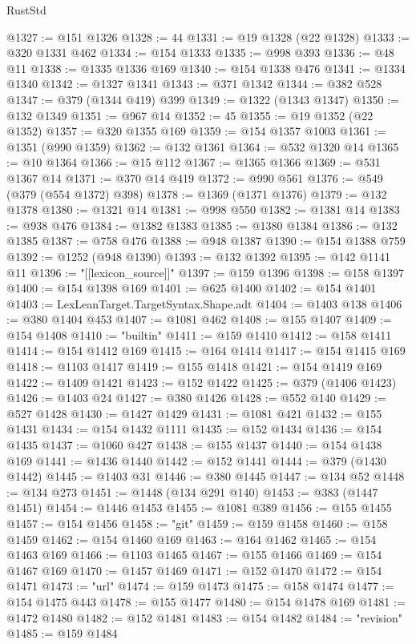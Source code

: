 \begin{lexlean}{RustStd}
\begin{coremodule}
@1327 := @151 @1326
@1328 := 44
@1331 := @19 @1328 (@22 @1328)
@1333 := @320 @1331 @462
@1334 := @154 @1333
@1335 := @998 @393
@1336 := @48 @11
@1338 := @1335 @1336 @169
@1340 := @154 @1338 @476
@1341 := @1334 @1340
@1342 := @1327 @1341
@1343 := @371 @1342
@1344 := @382 @528
@1347 := @379 (@1344 @419) @399
@1349 := @1322 (@1343 @1347)
@1350 := @132 @1349
@1351 := @967 @14
@1352 := 45
@1355 := @19 @1352 (@22 @1352)
@1357 := @320 @1355 @169
@1359 := @154 @1357 @1003
@1361 := @1351 (@990 @1359)
@1362 := @132 @1361
@1364 := @532 @1320 @14
@1365 := @10 @1364
@1366 := @15 @112
@1367 := @1365 @1366
@1369 := @531 @1367 @14
@1371 := @370 @14 @419
@1372 := @990 @561
@1376 := @549 (@379 (@554 @1372) @398)
@1378 := @1369 (@1371 @1376)
@1379 := @132 @1378
@1380 := @1321 @14
@1381 := @998 @550
@1382 := @1381 @14
@1383 := @938 @476
@1384 := @1382 @1383
@1385 := @1380 @1384
@1386 := @132 @1385
@1387 := @758 @476
@1388 := @948 @1387
@1390 := @154 @1388 @759
@1392 := @1252 (@948 @1390)
@1393 := @132 @1392
@1395 := @142 @1141 @11
@1396 := "[[lexicon_source]]"
@1397 := @159 @1396
@1398 := @158 @1397
@1400 := @154 @1398 @169
@1401 := @625 @1400
@1402 := @154 @1401
@1403 := LexLeanTarget.TargetSyntax.Shape.adt
@1404 := @1403 @138
@1406 := @380 @1404 @453
@1407 := @1081 @462
@1408 := @155 @1407
@1409 := @154 @1408
@1410 := "builtin"
@1411 := @159 @1410
@1412 := @158 @1411
@1414 := @154 @1412 @169
@1415 := @164 @1414
@1417 := @154 @1415 @169
@1418 := @1103 @1417
@1419 := @155 @1418
@1421 := @154 @1419 @169
@1422 := @1409 @1421
@1423 := @152 @1422
@1425 := @379 (@1406 @1423)
@1426 := @1403 @24
@1427 := @380 @1426
@1428 := @552 @140
@1429 := @527 @1428
@1430 := @1427 @1429
@1431 := @1081 @421
@1432 := @155 @1431
@1434 := @154 @1432 @1111
@1435 := @152 @1434
@1436 := @154 @1435
@1437 := @1060 @427
@1438 := @155 @1437
@1440 := @154 @1438 @169
@1441 := @1436 @1440
@1442 := @152 @1441
@1444 := @379 (@1430 @1442)
@1445 := @1403 @31
@1446 := @380 @1445
@1447 := @134 @52
@1448 := @134 @273
@1451 := @1448 (@134 @291 @140)
@1453 := @383 (@1447 @1451)
@1454 := @1446 @1453
@1455 := @1081 @389
@1456 := @155 @1455
@1457 := @154 @1456
@1458 := "git"
@1459 := @159 @1458
@1460 := @158 @1459
@1462 := @154 @1460 @169
@1463 := @164 @1462
@1465 := @154 @1463 @169
@1466 := @1103 @1465
@1467 := @155 @1466
@1469 := @154 @1467 @169
@1470 := @1457 @1469
@1471 := @152 @1470
@1472 := @154 @1471
@1473 := "url"
@1474 := @159 @1473
@1475 := @158 @1474
@1477 := @154 @1475 @443
@1478 := @155 @1477
@1480 := @154 @1478 @169
@1481 := @1472 @1480
@1482 := @152 @1481
@1483 := @154 @1482
@1484 := "revision"
@1485 := @159 @1484

\end{coremodule}
\end{lexlean}
